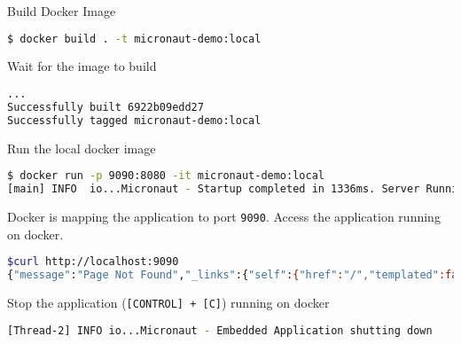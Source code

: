 \begin{enumerate}
Build Docker Image

\begin{lstlisting}[language=bash]
$ docker build . -t micronaut-demo:local
\end{lstlisting}

Wait for the image to build

\begin{lstlisting}[language=bash]
...
Successfully built 6922b09edd27
Successfully tagged micronaut-demo:local
\end{lstlisting}

Run the local docker image

\begin{lstlisting}[language=bash]
$ docker run -p 9090:8080 -it micronaut-demo:local
[main] INFO  io...Micronaut - Startup completed in 1336ms. Server Running: http://b09cb58fb87a:8080
\end{lstlisting}

Docker is mapping the application to port \texttt{9090}.  Access the application running on docker.

\begin{lstlisting}[language=bash]
$curl http://localhost:9090
{"message":"Page Not Found","_links":{"self":{"href":"/","templated":false}}}
\end{lstlisting}

Stop the application (\texttt{[CONTROL] + [C]}) running on docker

\begin{lstlisting}[language=bash]
[Thread-2] INFO io...Micronaut - Embedded Application shutting down
\end{lstlisting}


\end{enumerate}
